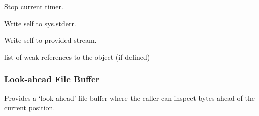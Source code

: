 \documentclass[letterpaper,10pt,english]{sphinxmanual}
\begin{document}
\begin{fulllineitems}
\begin{fulllineitems}
\end{fulllineitems}


\begin{fulllineitems}
\label{\detokenize{ref/util/ExecTimer:TotalDepth.util.ExecTimer.ExecTimerList.stopTimer}}
Stop current timer.

\end{fulllineitems}


\begin{fulllineitems}
\label{\detokenize{ref/util/ExecTimer:TotalDepth.util.ExecTimer.ExecTimerList.writeToStderr}}
Write self to sys.stderr.

\end{fulllineitems}


\begin{fulllineitems}
\label{\detokenize{ref/util/ExecTimer:TotalDepth.util.ExecTimer.ExecTimerList.writeToStream}}
Write self to provided stream.

\end{fulllineitems}


\begin{fulllineitems}
\label{\detokenize{ref/util/ExecTimer:TotalDepth.util.ExecTimer.ExecTimerList.__weakref__}}
list of weak references to the object (if defined)

\end{fulllineitems}


\end{fulllineitems}



\subsubsection{Look-ahead File Buffer}
\label{\detokenize{ref/util/FileBuffer:look-ahead-file-buffer}}\label{\detokenize{ref/util/FileBuffer::doc}}\label{\detokenize{ref/util/FileBuffer:module-TotalDepth.util.FileBuffer}}
Provides a ‘look ahead’ file buffer where the caller can inspect bytes ahead
of the current position.
\end{document}

